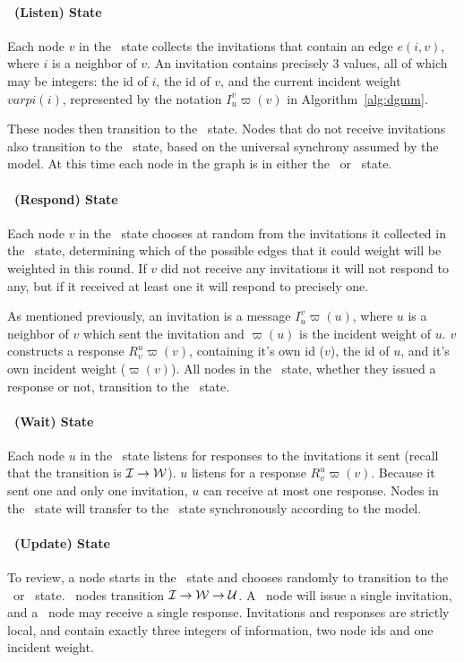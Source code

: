 \paragraph{\cLd\ (Listen) State} 
Each node $v$ in the \cLd\ state collects the invitations that contain an edge $e(i,v)$, where $i$ is a neighbor of $v$. An invitation contains precisely 3 values, all of which may be integers: the id of $i$, the id of $v$, and the current incident weight $varpi(i)$, represented by the notation $I_u^v\varpi(v)$ in Algorithm~\ref{alg:dgmm}. 

These nodes then transition to the \cRd\ state. Nodes that do not receive invitations also transition to the \cRd\ state, based on the universal synchrony assumed by the model. At this time each node in the graph is in either the \cRd\ or \cWd\ state. 

\paragraph{\cRd\ (Respond) State}
Each node $v$ in the \cRd\ state chooses at random from the invitations it collected in the \cLd\ state, determining which of the possible edges that it could weight will be weighted in this round. If $v$ did not receive any invitations it will not respond to any, but if it received at least one it will respond to precisely one. 

As mentioned previously, an invitation is a message $I_u^v\varpi(u)$, where $u$ is a neighbor of $v$ which sent the invitation and $\varpi(u)$ is the incident weight of $u$. $v$ constructs a response $R_v^u\varpi(v)$, containing it's own id ($v$), the id of $u$, and it's own incident weight ($\varpi(v)$). All nodes in the \cRd\ state, whether they issued a response or not, transition to the \cUd\ state. 

\paragraph{\cWd\ (Wait) State}
Each node $u$ in the \cWd\ state listens for responses to the invitations it sent (recall that the transition is ${\mathcal I} \rightarrow {\mathcal W}$). $u$ listens for a response $R_v^u\varpi(v)$. Because it sent one and only one invitation, $u$ can receive at most one response. Nodes in the \cWd\ state will transfer to the \cUd\ state synchronously according to the model. 

\paragraph{\cUd\ (Update) State}
To review, a node starts in the \cCd\ state and chooses randomly to transition to the \cId\ or \cLd\ state. \cId\ nodes transition ${\mathcal I} \rightarrow {\mathcal W} \rightarrow {\mathcal U}$. A \cId\ node will issue a single invitation, and a \cWd\ node may receive a single response. Invitations and responses are strictly local, and contain exactly three integers of information, two node ids and one incident weight. 

